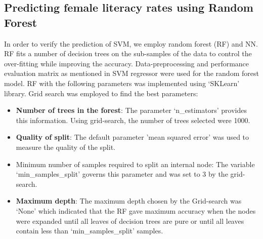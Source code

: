 \documentclass{article}
\begin{document}
\subsection{Predicting female literacy rates using Random Forest}
In order to verify the prediction of SVM, we employ random forest (RF) and NN. RF fits a number of decision trees on the sub-samples of the data to control the over-fitting while improving the accuracy. Data-preprocessing and performance evaluation matrix as mentioned in SVM regressor were used for the random forest model. RF with the following parameters was implemented using `SKLearn' library. Grid search was employed to find the best parameters:  
\begin{itemize}
	\item \textbf{Number of trees in the forest}:  The parameter `n\_estimators' provides this information. Using grid-search, the number of trees selected were 1000. 
	\item \textbf{Quality of split}:  The default parameter 'mean squared error' was used to measure the quality of the split. 
	\item{Minimum number of samples required to split an internal node}: The variable `min\_samples\_split' governs this parameter and was set to 3 by the grid-search.
	\item \textbf{Maximum depth}:  The maximum depth chosen by the Grid-search was `None' which indicated that the RF gave maximum accuracy when the nodes were expanded until all leaves of decision trees are pure or until all leaves contain less than `min\_samples\_split' samples.
\end{itemize}
\end{document}
